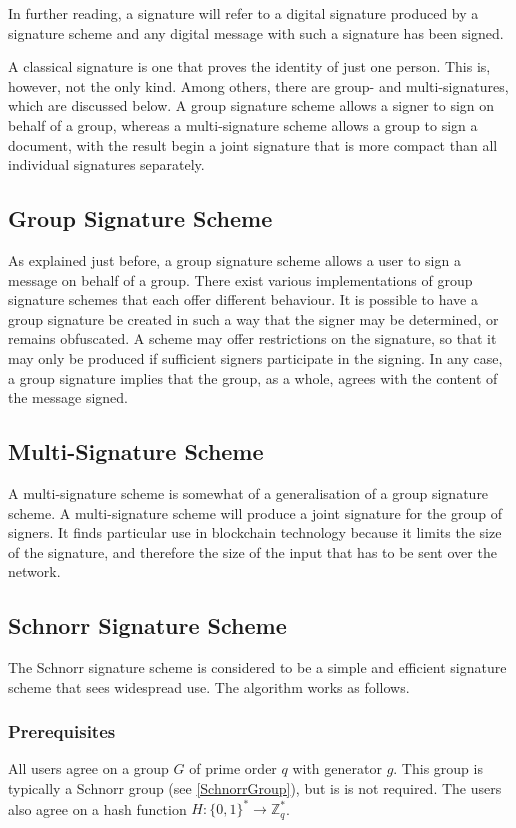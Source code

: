 In further reading, a signature will refer to a digital signature produced by a signature scheme and any digital message with such a signature has been signed.

A classical signature is one that proves the identity of just one person. This is, however, not the only kind. Among others, there are group- and multi-signatures, which are discussed below. A group signature scheme allows a signer to sign on behalf of a group, whereas a multi-signature scheme allows a group to sign a document, with the result begin a joint signature that is more compact than all individual signatures separately.

\subsection{Group Signature Scheme}
As explained just before, a group signature scheme allows a user to sign a message on behalf of a group. There exist various implementations of group signature schemes that each offer different behaviour. It is possible to have a group signature be created in such a way that the signer may be determined, or remains obfuscated. A scheme may offer restrictions on the signature, so that it may only be produced if sufficient signers participate in the signing. In any case, a group signature implies that the group, as a whole, agrees with the content of the message signed.

\subsection{Multi-Signature Scheme} \label{MultiSig}
A multi-signature scheme is somewhat of a generalisation of a group signature scheme. A multi-signature scheme will produce a joint signature for the group of signers. It finds particular use in blockchain technology because it limits the size of the signature, and therefore the size of the input that has to be sent over the network.

\subsection{Schnorr Signature Scheme} \label{Schnorr}
The Schnorr signature scheme is considered to be a simple and efficient signature scheme that sees widespread use. The algorithm works as follows.

\subsubsection{Prerequisites}
All users agree on a group $G$ of prime order $q$ with generator $g$. This group is typically a Schnorr group (see \ref{SchnorrGroup}), but is is not required. The users also agree on a hash function $H: \{0,1\}^*\to\mathbb{Z}_{q}^*$.

